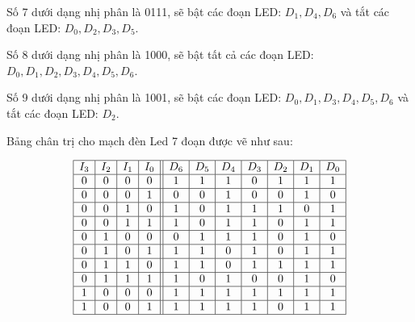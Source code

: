 Số 7 dưới dạng nhị phân là 0111, sẽ bật các đoạn LED: \(D_1, D_4,  D_6\) và tắt các đoạn LED: \(D_0, D_2, D_3, D_5\).

Số 8 dưới dạng nhị phân là 1000, sẽ bật tất cả các đoạn LED: \(D_0, D_1, D_2, D_3, D_4, D_5, D_6\).

Số 9 dưới dạng nhị phân là 1001, sẽ bật các đoạn LED: \(D_0, D_1, D_3, D_4, D_5, D_6\) và tắt các đoạn LED: \(D_2\).

Bảng chân trị cho mạch đèn Led 7 đoạn được vẽ như sau:

\renewcommand{\arraystretch}{1.5}

\[
	\begin{array}{|>{\Large}c|>{\Large}c|>{\Large}c|>{\Large}c||>{\Large}c|>{\Large}c|>{\Large}c|>{\Large}c|>{\Large}c|>{\Large}c|>{\Large}c|}
		\hline
		I_3 & I_2 & I_1 & I_0 & D_6 & D_5 & D_4 & D_3 & D_2 & D_1 & D_0 \\
		\hline
		0   & 0   & 0   & 0   & 1   & 1   & 1   & 0   & 1   & 1   & 1   \\
		\hline

		0   & 0   & 0   & 1   & 0   & 0   & 1   & 0   & 0   & 1   & 0   \\
		\hline

		0   & 0   & 1   & 0   & 1   & 0   & 1   & 1   & 1   & 0   & 1   \\
		\hline

		0   & 0   & 1   & 1   & 1   & 0   & 1   & 1   & 0   & 1   & 1   \\
		\hline

		0   & 1   & 0   & 0   & 0   & 1   & 1   & 1   & 0   & 1   & 0   \\
		\hline

		0   & 1   & 0   & 1   & 1   & 1   & 0   & 1   & 0   & 1   & 1   \\
		\hline

		0   & 1   & 1   & 0   & 1   & 1   & 0   & 1   & 1   & 1   & 1   \\
		\hline

		0   & 1   & 1   & 1   & 1   & 0   & 1   & 0   & 0   & 1   & 0   \\
		\hline

		1   & 0   & 0   & 0   & 1   & 1   & 1   & 1   & 1   & 1   & 1   \\
		\hline

		1   & 0   & 0   & 1   & 1   & 1   & 1   & 1   & 0   & 1   & 1   \\
		\hline
	\end{array}
\]